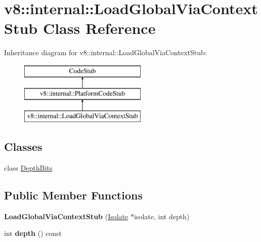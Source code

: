 \hypertarget{classv8_1_1internal_1_1_load_global_via_context_stub}{}\section{v8\+:\+:internal\+:\+:Load\+Global\+Via\+Context\+Stub Class Reference}
\label{classv8_1_1internal_1_1_load_global_via_context_stub}
Inheritance diagram for v8\+:\+:internal\+:\+:Load\+Global\+Via\+Context\+Stub\+:\begin{figure}[H]
\begin{center}
\leavevmode
\includegraphics[height=3.000000cm]{classv8_1_1internal_1_1_load_global_via_context_stub}
\end{center}
\end{figure}
\subsection*{Classes}
\begin{DoxyCompactItemize}
\item 
class \hyperlink{classv8_1_1internal_1_1_load_global_via_context_stub_1_1_depth_bits}{Depth\+Bits}
\end{DoxyCompactItemize}
\subsection*{Public Member Functions}
\begin{DoxyCompactItemize}
\item 
{\bfseries Load\+Global\+Via\+Context\+Stub} (\hyperlink{classv8_1_1internal_1_1_isolate}{Isolate} $\ast$isolate, int depth)\hypertarget{classv8_1_1internal_1_1_load_global_via_context_stub_a9281b397defc6d54f320b94babb622fd}{}\label{classv8_1_1internal_1_1_load_global_via_context_stub_a9281b397defc6d54f320b94babb622fd}

\item 
int {\bfseries depth} () const \hypertarget{classv8_1_1internal_1_1_load_global_via_context_stub_ac5e2608db21f77e9c49df5464f43f456}{}\label{classv8_1_1internal_1_1_load_global_via_context_stub_ac5e2608db21f77e9c49df5464f43f456}

\end{DoxyCompactItemize}

